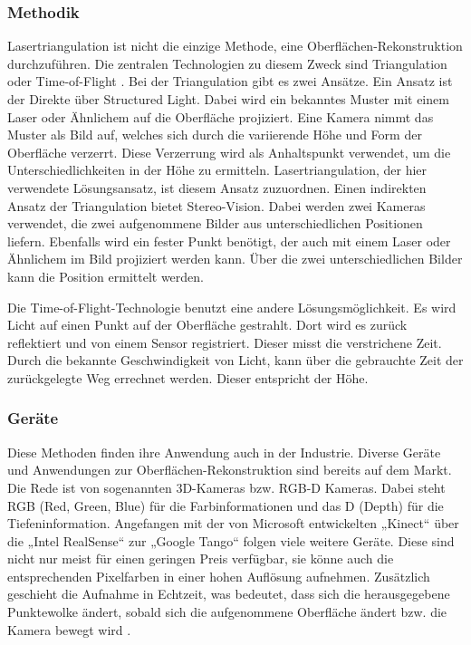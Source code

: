 		\subsubsection{Methodik}
		Lasertriangulation ist nicht die einzige Methode, eine Oberflächen-Rekonstruktion durchzuführen. Die zentralen Technologien zu diesem Zweck sind Triangulation oder Time-of-Flight \citep[vgl.][]{zollhofer_state_2018}. 
		Bei der Triangulation gibt es zwei Ansätze. Ein Ansatz ist der Direkte über Structured Light. Dabei wird ein bekanntes Muster mit einem Laser oder Ähnlichem auf die Oberfläche projiziert. Eine Kamera nimmt das Muster als Bild auf, welches sich durch die variierende Höhe und Form der Oberfläche verzerrt. Diese Verzerrung wird als Anhaltspunkt verwendet, um die Unterschiedlichkeiten in der Höhe zu ermitteln. Lasertriangulation, der hier verwendete Lösungsansatz, ist diesem Ansatz zuzuordnen. \newline
		Einen indirekten Ansatz der Triangulation bietet Stereo-Vision. Dabei werden zwei Kameras verwendet, die zwei aufgenommene Bilder aus unterschiedlichen Positionen liefern. Ebenfalls wird ein fester Punkt benötigt, der auch mit einem Laser oder Ähnlichem im Bild projiziert werden kann. Über die zwei unterschiedlichen Bilder kann die Position ermittelt werden.
		
		Die Time-of-Flight-Technologie benutzt eine andere Lösungsmöglichkeit. Es wird Licht auf einen Punkt auf der Oberfläche gestrahlt. Dort wird es zurück reflektiert und von einem Sensor registriert. Dieser misst die verstrichene Zeit. Durch die bekannte Geschwindigkeit von Licht, kann über die gebrauchte Zeit der zurückgelegte Weg errechnet werden. Dieser entspricht der Höhe.
	
		\subsubsection{Geräte}
		Diese Methoden finden ihre Anwendung auch in der Industrie. Diverse Geräte und Anwendungen zur Oberflächen-Rekonstruktion sind bereits auf dem Markt. Die Rede ist von sogenannten 3D-Kameras bzw. RGB-D Kameras. Dabei steht RGB (Red, Green, Blue) für die Farbinformationen und das D (Depth) für die Tiefeninformation. Angefangen mit der von Microsoft entwickelten „Kinect“ über die „Intel RealSense“ zur „Google Tango“ folgen viele weitere Geräte. Diese sind nicht nur meist für einen geringen Preis verfügbar, sie könne auch die entsprechenden Pixelfarben in einer hohen Auflösung aufnehmen.
		Zusätzlich geschieht die Aufnahme in Echtzeit, was bedeutet, dass sich die herausgegebene Punktewolke ändert, sobald sich die aufgenommene Oberfläche ändert bzw. die Kamera bewegt wird \citep[vgl.][]{zollhofer_state_2018}.
			
